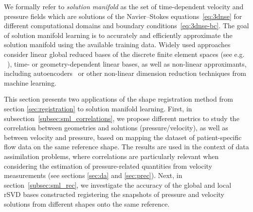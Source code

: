 
We formally refer to \textsl{solution manifold} as the set of time-dependent velocity and pressure fields which are solutions of the Navier--Stokes equations~\eqref{eq:3dnse}
for different computational domains and boundary conditions~\eqref{eq:3dnse-bc}. 
The goal of solution manifold learning is to accurately and efficiently approximate the solution manifold using the available training data. 
%
Widely used approaches consider linear global reduced bases of the discrete finite element spaces 
(see e.g. ~\cite{benner_model_2017,hesthaven2016certified,rozza2022advanced}), time- or geometry-dependent linear bases, as well as 
non-linear approximants, including autoencoders~\cite{Fresca2020, romor2023nonlinear, ROMOR2025113729} or other non-linear dimension reduction techniques from machine learning. 

This section presents two applications of the shape registration method from section \ref{sec:registration} to solution manifold learning. 
First, in subsection~\ref{subsec:sml_correlations}, we propose different metrics to study the correlation between geometries and solutions (pressure/velocity), as well 
as between velocity and pressure, based on mapping the dataset of patient-specific flow data on the same reference shape.
The results are used in the context of data assimilation problems,  where correlations are particularly relevant when considering the estimation of pressure-related quantities from velocity measurements (see sections \ref{sec:da} and \ref{sec:prec}).  
Next, in section~\ref{subsec:sml_rec}, we investigate the accuracy of the global and local rSVD bases constructed registering the snapshots of pressure and velocity solutions from different shapes onto the same reference.

